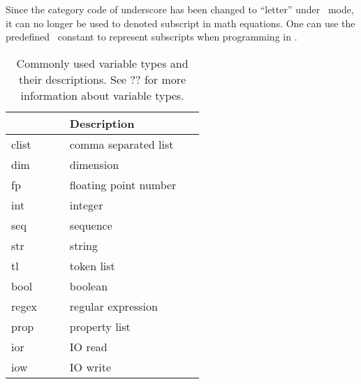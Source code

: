 \documentclass{ltugboat}
\begin{document}
Since the category code of underscore has been changed to ``letter'' under \liii\ mode, it can no longer be used to denoted subscript in math equations.
One can use the predefined \liii\ constant  to represent subscripts when programming in \liii.
\begin{table}[htpb]
\centering
\scriptsize
\begin{tabular}{>{\ttfamily\centering}p{0.15\linewidth}p{0.4\linewidth}}
\toprule
\multicolumn{1}{c}{Type} & Description\\ \midrule
clist & comma separated list\\
dim & dimension\\
fp & floating point number\\
int & integer\\
seq & sequence\\
str & string\\
tl & token list\\
bool & boolean\\
regex & regular expression\\
prop & property list\\
ior & IO read\\
iow & IO write\\ \bottomrule
\end{tabular}
\caption{Commonly used variable types and their descriptions. See ?? for more information about variable types.}
\label{tbl:var-type}
\end{table}
\end{document}
